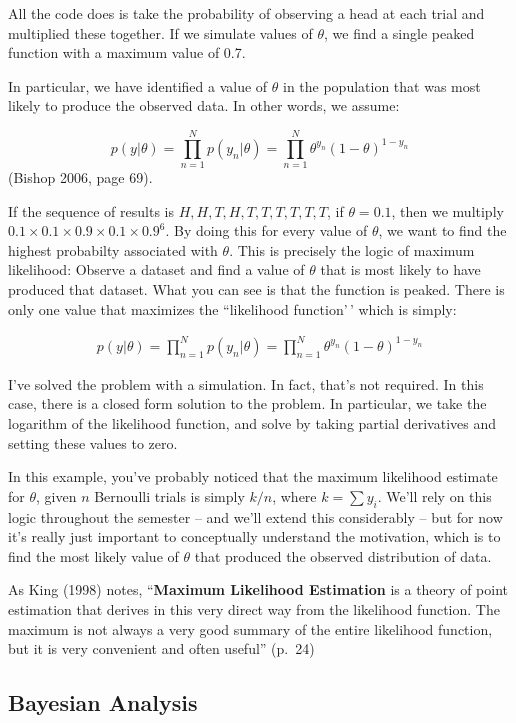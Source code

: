 \documentclass[
]{book}
\begin{document}
All the code does is take the probability of observing a head at each trial and multiplied these together. If we simulate values of \(\theta\), we find a single peaked function with a maximum value of 0.7.

In particular, we have identified a value of \(\theta\) in the population that was most likely to produce the observed data. In other words, we assume:

\[p(y|\theta)=\prod_{n=1}^Np(y_n|\theta)=\prod_{n=1}^N\theta^{y_n}(1-\theta)^{1-{y_n}}\]
(Bishop 2006, page 69).

If the sequence of results is \({H,H, T, H, T, T, T, T, T, T}\), if \(\theta=0.1\), then we multiply \(0.1 \times 0.1 \times 0.9 \times 0.1 \times 0.9^6\). By doing this for every value of \(\theta\), we want to find the highest probabilty associated with \(\theta\). This is precisely the logic of maximum likelihood: Observe a dataset and find a value of \(\theta\) that is most likely to have produced that dataset. What you can see is that the function is peaked. There is only one value that maximizes the ``likelihood function'\,' which is simply:

\begin{eqnarray}
p(y|\theta)=\prod_{n=1}^Np(y_n|\theta)=\prod_{n=1}^N\theta^{y_n}(1-\theta)^{1-{y_n}}
\end{eqnarray}

I've solved the problem with a simulation. In fact, that's not required. In this case, there is a closed form solution to the problem. In particular, we take the logarithm of the likelihood function, and solve by taking partial derivatives and setting these values to zero.

In this example, you've probably noticed that the maximum likelihood estimate for \(\theta\), given \(n\) Bernoulli trials is simply \(k/n\), where \(k=\sum y_i\). We'll rely on this logic throughout the semester -- and we'll extend this considerably -- but for now it's really just important to conceptually understand the motivation, which is to find the most likely value of \(\theta\) that produced the observed distribution of data.

As King (1998) notes, ``\textbf{Maximum Likelihood Estimation} is a theory of point estimation that derives in this very direct way from the likelihood function. The maximum is not always a very good summary of the entire likelihood function, but it is very convenient and often useful'' (p.~24)

\subsection{Bayesian Analysis}\label{bayesian-analysis}
\end{document}
